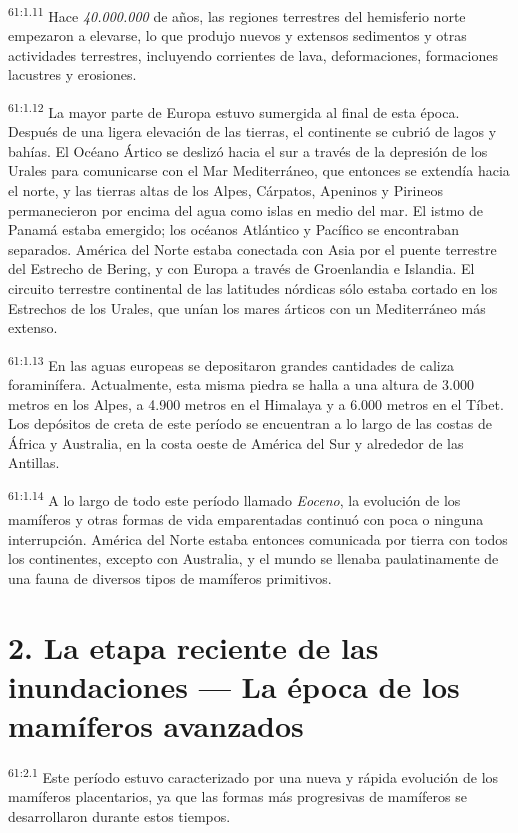 \par
\textsuperscript{61:1.11} Hace \textit{40.000.000} de años, las regiones terrestres del hemisferio norte empezaron a elevarse, lo que produjo nuevos y extensos sedimentos y otras actividades terrestres, incluyendo corrientes de lava, deformaciones, formaciones lacustres y erosiones.

\par
\textsuperscript{61:1.12} La mayor parte de Europa estuvo sumergida al final de esta época. Después de una ligera elevación de las tierras, el continente se cubrió de lagos y bahías. El Océano
Ártico se deslizó hacia el sur a través de la depresión de los Urales para comunicarse con el Mar Mediterráneo, que entonces se extendía hacia el norte, y las tierras altas de los Alpes, Cárpatos, Apeninos y Pirineos permanecieron por encima del agua como islas en medio del mar. El istmo de Panamá estaba emergido; los océanos Atlántico y Pacífico se encontraban separados. América del Norte estaba conectada con Asia por el puente terrestre del Estrecho de Bering, y con Europa a través de Groenlandia e Islandia. El circuito terrestre continental de las latitudes nórdicas sólo estaba cortado en los Estrechos de los Urales, que unían los mares árticos con un Mediterráneo más extenso.

\par
\textsuperscript{61:1.13} En las aguas europeas se depositaron grandes cantidades de caliza foraminífera. Actualmente, esta misma piedra se halla a una altura de 3.000 metros en los Alpes, a 4.900 metros en el Himalaya y a 6.000 metros en el Tíbet. Los depósitos de creta de este período se encuentran a lo largo de las costas de África y Australia, en la costa oeste de América del Sur y alrededor de las Antillas.

\par
\textsuperscript{61:1.14} A lo largo de todo este período llamado \textit{Eoceno}, la evolución de los mamíferos y otras formas de vida emparentadas continuó con poca o ninguna interrupción. América del Norte estaba entonces comunicada por tierra con todos los continentes, excepto con Australia, y el mundo se llenaba paulatinamente de una fauna de diversos tipos de mamíferos primitivos.

\section*{2. La etapa reciente de las inundaciones --- La época de los mamíferos avanzados}
\par
\textsuperscript{61:2.1} Este período estuvo caracterizado por una nueva y rápida evolución de los mamíferos placentarios, ya que las formas más progresivas de mamíferos se desarrollaron durante estos tiempos.


